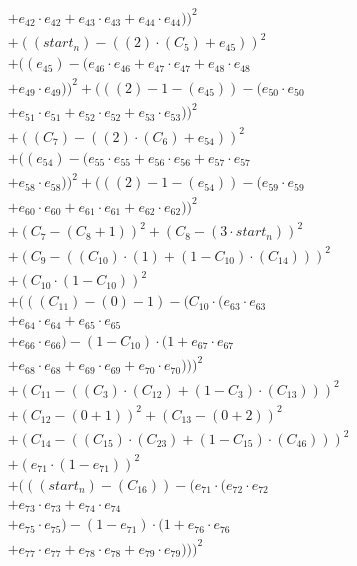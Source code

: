 \documentclass[10pt, a4paper]{article}
\begin{document}
\begin{small}
\begin{align*}
& + e_{42} \cdot e_{42} + e_{43} \cdot e_{43} + e_{44} \cdot e_{44}))^{2} \\
& + ((start_n) - ((2)  \cdot  (C_{5}) + e_{45}))^{2} \\
& + ((e_{45}) - (e_{46} \cdot e_{46} + e_{47} \cdot e_{47} + e_{48} \cdot e_{48} \\
& + e_{49} \cdot e_{49}))^{2} + (((2) - 1 - (e_{45})) - (e_{50} \cdot e_{50} \\
& + e_{51} \cdot e_{51} + e_{52} \cdot e_{52} + e_{53} \cdot e_{53}))^{2} \\
& + ((C_{7}) - ((2)  \cdot  (C_{6}) + e_{54}))^{2} \\
& + ((e_{54}) - (e_{55} \cdot e_{55} + e_{56} \cdot e_{56} + e_{57} \cdot e_{57} \\
& + e_{58} \cdot e_{58}))^{2} + (((2) - 1 - (e_{54})) - (e_{59} \cdot e_{59} \\
& + e_{60} \cdot e_{60} + e_{61} \cdot e_{61} + e_{62} \cdot e_{62}))^{2} \\
& + (C_{7} - (C_{8} + 1))^{2} + (C_{8} - (3  \cdot  start_n))^{2} \\
& + (C_{9} - ((C_{10})  \cdot  (1) + (1 - C_{10})  \cdot  (C_{14})))^{2} \\
& + (C_{10} \cdot (1 - C_{10}))^{2} \\
& + (((C_{11}) - (0) - 1) - (C_{10} \cdot (e_{63} \cdot e_{63} \\
& + e_{64} \cdot e_{64} + e_{65} \cdot e_{65} \\
& + e_{66} \cdot e_{66}) - (1 - C_{10}) \cdot (1 + e_{67} \cdot e_{67} \\
& + e_{68} \cdot e_{68} + e_{69} \cdot e_{69} + e_{70} \cdot e_{70})))^{2} \\
& + (C_{11} - ((C_{3})  \cdot  (C_{12}) + (1 - C_{3})  \cdot  (C_{13})))^{2} \\
& + (C_{12} - (0 + 1))^{2} + (C_{13} - (0 + 2))^{2} \\
& + (C_{14} - ((C_{15})  \cdot  (C_{23}) + (1 - C_{15})  \cdot  (C_{46})))^{2} \\
& + (e_{71} \cdot (1 - e_{71}))^{2} \\
& + (((start_n) - (C_{16})) - (e_{71} \cdot (e_{72} \cdot e_{72} \\
& + e_{73} \cdot e_{73} + e_{74} \cdot e_{74} \\
& + e_{75} \cdot e_{75}) - (1 - e_{71}) \cdot (1 + e_{76} \cdot e_{76} \\
& + e_{77} \cdot e_{77} + e_{78} \cdot e_{78} + e_{79} \cdot e_{79})))^{2} \\

\end{align*}
\end{small}
\end{document}
